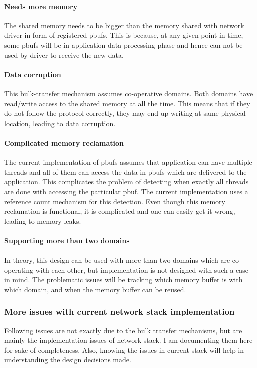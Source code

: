 \documentclass[a4paper,twoside]{report} %
\begin{document}
\paragraph{Needs more memory}
The shared memory needs to be bigger than the memory shared with
network driver in form of registered pbufs.  This is because, at any
given point in time, some pbufs will be in application data processing
phase and hence can-not be used by driver to receive the new data.

\paragraph{Data corruption}
This bulk-transfer mechanism assumes co-operative domains.  Both
domains have read/write access to the shared memory at all the time.
This means that if they do not follow the protocol correctly, they may
end up writing at same physical location, leading to data corruption.

\paragraph{Complicated memory reclamation}
The current implementation of pbufs assumes that application can have
multiple threads and all of them can access the data in pbufs which
are delivered to the application.  This complicates the problem of
detecting when exactly all threads are done with accessing the
particular pbuf.  The current implementation uses a reference count
mechanism for this detection.  Even though this memory reclamation is
functional, it is complicated and one can easily get it wrong, leading
to memory leaks.

\paragraph{Supporting more than two domains}
In theory, this design can be used with more than two domains which
are co-operating with each other, but implementation is not designed
with such a case in mind.  The problematic issues will be tracking
which memory buffer is with which domain, and when the memory buffer
can be reused.

\subsubsection{More issues with current network stack implementation}
Following issues are not exactly due to the bulk transfer mechanisms,
but are mainly the implementation issues of network stack.  I am
documenting them here for sake of completeness.  Also, knowing the
issues in current stack will help in understanding the design
decisions made.
\end{document}
